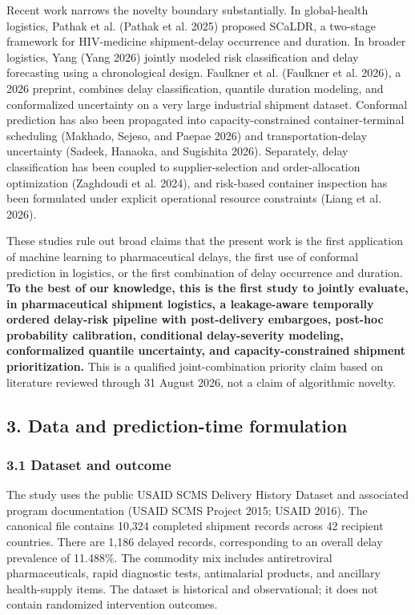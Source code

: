 \documentclass[
]{article}
\begin{document}
Recent work narrows the novelty boundary substantially. In global-health
logistics, Pathak et al. (Pathak et al. 2025) proposed SCaLDR, a
two-stage framework for HIV-medicine shipment-delay occurrence and
duration. In broader logistics, Yang (Yang 2026) jointly modeled risk
classification and delay forecasting using a chronological design.
Faulkner et al. (Faulkner et al. 2026), a 2026 preprint, combines delay
classification, quantile duration modeling, and conformalized
uncertainty on a very large industrial shipment dataset. Conformal
prediction has also been propagated into capacity-constrained
container-terminal scheduling (Makhado, Sejeso, and Paepae 2026) and
transportation-delay uncertainty (Sadeek, Hanaoka, and Sugishita 2026).
Separately, delay classification has been coupled to supplier-selection
and order-allocation optimization (Zaghdoudi et al. 2024), and
risk-based container inspection has been formulated under explicit
operational resource constraints (Liang et al. 2026).

These studies rule out broad claims that the present work is the first
application of machine learning to pharmaceutical delays, the first use
of conformal prediction in logistics, or the first combination of delay
occurrence and duration. \textbf{To the best of our knowledge, this is
the first study to jointly evaluate, in pharmaceutical shipment
logistics, a leakage-aware temporally ordered delay-risk pipeline with
post-delivery embargoes, post-hoc probability calibration, conditional
delay-severity modeling, conformalized quantile uncertainty, and
capacity-constrained shipment prioritization.} This is a qualified
joint-combination priority claim based on literature reviewed through 31
August 2026, not a claim of algorithmic novelty.

\subsection{3. Data and prediction-time
formulation}\label{data-and-prediction-time-formulation}

\subsubsection{3.1 Dataset and outcome}\label{dataset-and-outcome}

The study uses the public USAID SCMS Delivery History Dataset and
associated program documentation (USAID SCMS Project 2015; USAID 2016).
The canonical file contains 10,324 completed shipment records across 42
recipient countries. There are 1,186 delayed records, corresponding to
an overall delay prevalence of 11.488\%. The commodity mix includes
antiretroviral pharmaceuticals, rapid diagnostic tests, antimalarial
products, and ancillary health-supply items. The dataset is historical
and observational; it does not contain randomized intervention outcomes.
\end{document}
